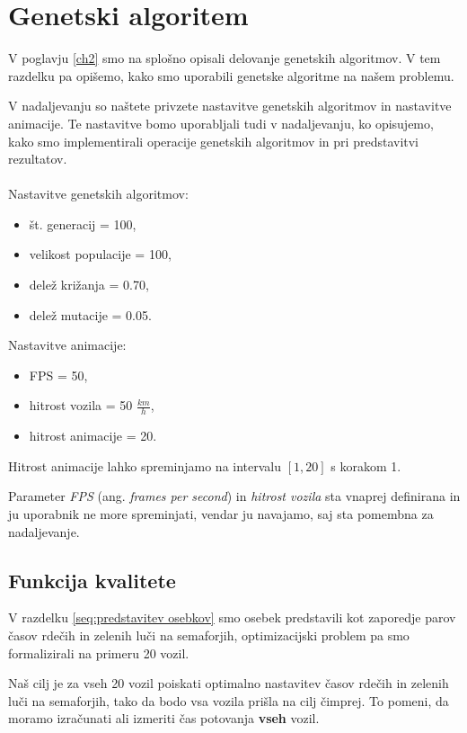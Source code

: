 \documentclass[a4paper, 12pt]{book}
\begin{document}
\section{Genetski algoritem}
\label{seq:nastavitve parametrov}
V poglavju \ref{ch2} smo na splo\v sno opisali delovanje genetskih algoritmov. V tem razdelku pa opi\v semo, kako smo uporabili genetske algoritme na na\v sem problemu.

V nadaljevanju so na\v stete privzete nastavitve genetskih algoritmov in nastavitve animacije. 
\pagebreak
Te nastavitve bomo uporabljali tudi v nadaljevanju, ko opisujemo, kako smo implementirali operacije genetskih algoritmov in pri predstavitvi rezultatov.\\\\
Nastavitve genetskih algoritmov:
\begin{itemize}
\item \v st. generacij = 100,
\item velikost populacije = 100,
\item dele\v z kri\v zanja = 0.70,
\item dele\v z mutacije = 0.05.
\end{itemize}
Nastavitve animacije:
\begin{itemize}
\item FPS = 50,
\item hitrost vozila = 50 $\frac{km}{h}$,
\item hitrost animacije = 20.
\end{itemize}
Hitrost animacije lahko spreminjamo na intervalu $[1, 20]$ s korakom 1.

Parameter \textit{FPS} (ang. \textit{frames per second}) in \textit{hitrost vozila} sta vnaprej definirana in ju uporabnik ne more spreminjati, vendar ju navajamo, saj sta pomembna za nadaljevanje.

\subsection{Funkcija kvalitete}
V razdelku \ref{seq:predstavitev osebkov} smo osebek predstavili kot zaporedje parov \v casov rde\v cih in zelenih lu\v ci na semaforjih, optimizacijski problem pa smo formalizirali na primeru 20 vozil.

Na\v s cilj je za vseh 20 vozil poiskati optimalno nastavitev \v casov rde\v cih in zelenih lu\v ci na semaforjih, tako da bodo vsa vozila pri\v sla na cilj \v cimprej. To pomeni, da moramo izra\v cunati ali izmeriti \v cas potovanja \textbf{vseh} vozil.
\end{document}
